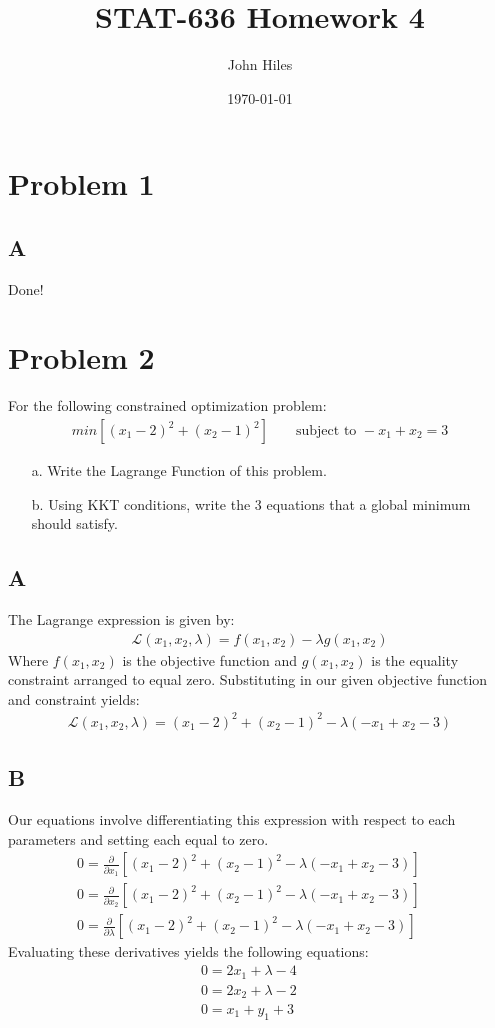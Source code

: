 \documentclass{article}
\title{STAT-636 Homework 4}
\author{John Hiles}
\date\today
\begin{document}
\maketitle %

\section*{Problem 1}
\subsection*{A}
Done!
\section*{Problem 2}
For the following constrained optimization problem:
\begin{align*}
min [(x_1 - 2)^2 + (x_2 - 1)^2] && \text{ subject to } -x_1 + x_2 = 3
\end{align*}
\begin{enumerate}
\item[a.] Write the Lagrange Function of this problem.
\item[b.] Using KKT conditions, write the 3 equations that a global minimum should satisfy.
\end{enumerate}
\subsection*{A}
The Lagrange expression is given by:
\begin{align*}
\mathcal{L}(x_1,x_2,\lambda) = f(x_1,x_2) - \lambda g(x_1,x_2)
\end{align*}
Where $f(x_1,x_2)$ is the objective function and $g(x_1,x_2)$ is the equality constraint arranged to equal zero. Substituting in our given objective function and constraint yields:
\begin{align*}
\boxed{ \mathcal{L}(x_1,x_2,\lambda) = (x_1 - 2)^2 + (x_2 - 1)^2 - \lambda (-x_1 + x_2 - 3) }
\end{align*}
\subsection*{B}
Our equations involve differentiating this expression with respect to each parameters and setting each equal to zero.
\begin{align*}
0 = \frac{\partial}{\partial x_1}[(x_1 - 2)^2 + (x_2 - 1)^2 - \lambda (-x_1 + x_2 - 3)] && \\
0 = \frac{\partial}{\partial x_2}[(x_1 - 2)^2 + (x_2 - 1)^2 - \lambda (-x_1 + x_2 - 3)] && \\
0 = \frac{\partial}{\partial \lambda}[(x_1 - 2)^2 + (x_2 - 1)^2 - \lambda (-x_1 + x_2 - 3)]
\end{align*}
Evaluating these derivatives yields the following equations:
\begin{align*}
\boxed{0 = 2x_1+\lambda-4} && \\
\boxed{0 = 2x_2+\lambda-2} && \\
\boxed{0 = x_1+y_1+3}
\end{align*}
\clearpage
\end{document}
